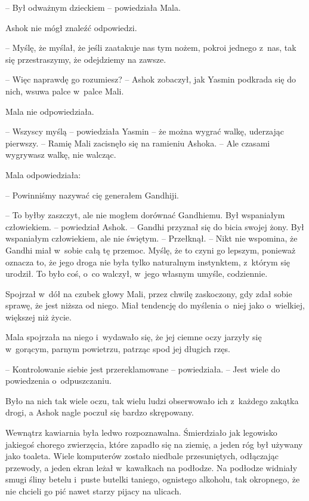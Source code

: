 \documentclass[oneside,polish,11pt,rmheadings]{mwbk}
\begin{document}
-- Był odważnym dzieckiem -- powiedziała Mala.

Ashok nie mógł znaleźć odpowiedzi.

-- Myślę, że myślał, że jeśli zaatakuje nas tym nożem, pokroi jednego z~nas, tak się przestraszymy, że odejdziemy na zawsze.

-- Więc naprawdę go rozumiesz? -- Ashok zobaczył, jak Yasmin podkrada się do nich, wsuwa palce w~palce Mali.

Mala nie odpowiedziała.

-- Wszyscy myślą -- powiedziała Yasmin -- że można wygrać walkę, uderzając pierwszy. -- Ramię Mali zacisnęło się na ramieniu Ashoka. -- Ale czasami wygrywasz walkę, nie walcząc.

Mala odpowiedziała: 

-- Powinniśmy nazywać cię generałem Gandhiji.

-- To byłby zaszczyt, ale nie mogłem dorównać Gandhiemu. Był wspaniałym człowiekiem. -- powiedział Ashok. -- Gandhi przyznał się do bicia swojej żony. Był wspaniałym człowiekiem, ale nie świętym. -- Przełknął. -- Nikt nie wspomina, że Gandhi miał w~sobie całą tę przemoc. Myślę, że to czyni go lepszym, ponieważ oznacza to, że jego droga nie była tylko naturalnym instynktem, z~którym się urodził. To było coś, o~co walczył, w~jego własnym umyśle, codziennie. 

Spojrzał w~dół na czubek głowy Mali, przez chwilę zaskoczony, gdy zdał sobie sprawę, że jest niższa od niego. Miał tendencję do myślenia o~niej jako o~wielkiej, większej niż życie.

Mala spojrzała na niego i~wydawało się, że jej ciemne oczy jarzyły się w~gorącym, parnym powietrzu, patrząc spod jej długich rzęs. 

-- Kontrolowanie siebie jest przereklamowane -- powiedziała. -- Jest wiele do powiedzenia o~odpuszczaniu.

Było na nich tak wiele oczu, tak wielu ludzi obserwowało ich z~każdego zakątka drogi, a Ashok nagle poczuł się bardzo skrępowany.

Wewnątrz kawiarnia była ledwo rozpoznawalna. Śmierdziało jak legowisko jakiegoś chorego zwierzęcia, które zapadło się na ziemię, a jeden róg był używany jako toaleta. Wiele komputerów zostało niedbale przesuniętych, odłączając przewody, a jeden ekran leżał w~kawałkach na podłodze. Na podłodze widniały smugi śliny betelu i~puste butelki taniego, ognistego alkoholu, tak okropnego, że nie chcieli go pić nawet starzy pijacy na ulicach.
\end{document}

